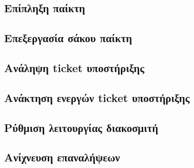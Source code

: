\subsection{Επίπληξη παίκτη}
\subsection{Επεξεργασία σάκου παίκτη}
\subsection{Ανάληψη ticket υποστήριξης}
\subsection{Ανάκτηση ενεργών ticket υποστήριξης}
\subsection{Ρύθμιση λειτουργίας διακοσμιτή}
\subsection{Ανίχνευση επαναλήψεων}